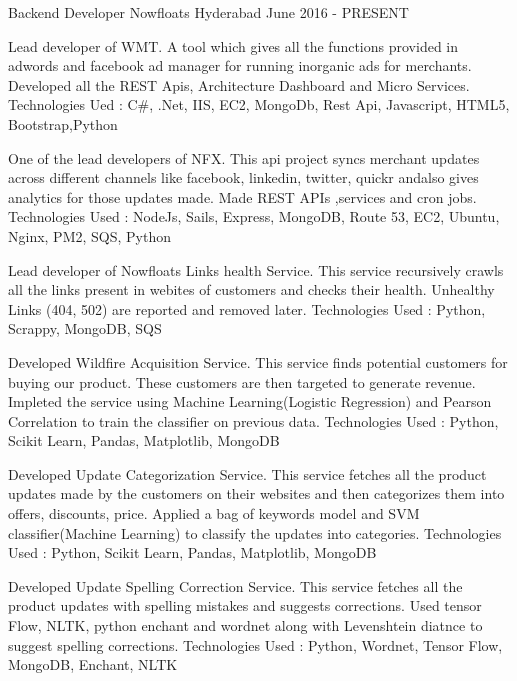 

\begin{cventries}

  \cventry
    {Backend Developer} %
    {Nowfloats} %
    {Hyderabad} %
    {June 2016 - PRESENT} %
    {
      \begin{cvitems} %
        \item {Lead developer of WMT. A tool which gives all the functions provided in adwords and facebook ad manager for running inorganic ads for merchants. Developed all the REST Apis, Architecture Dashboard and Micro Services. Technologies Ued : C\#, .Net, IIS, EC2, MongoDb, Rest Api, Javascript, HTML5, Bootstrap,Python}
        \item {One of the lead developers of NFX. This api project syncs merchant updates across different channels like facebook, linkedin, twitter, quickr andalso gives analytics for those updates made. Made REST APIs ,services and cron jobs. Technologies Used : NodeJs, Sails, Express, MongoDB, Route 53, EC2, Ubuntu, Nginx, PM2, SQS, Python}
        \item {Lead developer of Nowfloats Links health Service. This service recursively crawls all the links present in webites of customers and checks their health. Unhealthy Links (404, 502) are reported and removed later. Technologies Used : Python, Scrappy, MongoDB, SQS  }
        \item {Developed Wildfire Acquisition Service. This service finds potential customers for buying our product. These customers are then targeted to generate revenue. Impleted the service using Machine Learning(Logistic Regression) and Pearson Correlation to train the classifier on previous data. Technologies Used : Python, Scikit Learn, Pandas, Matplotlib, MongoDB  }
        \item {Developed Update Categorization Service. This service fetches all the product updates made by the customers on their websites and then categorizes them into offers, discounts, price. Applied a bag of keywords model and SVM classifier(Machine Learning) to classify the updates into categories. Technologies Used : Python, Scikit Learn, Pandas, Matplotlib, MongoDB  }
        \item {Developed Update Spelling Correction Service. This service fetches all the product updates with spelling mistakes and suggests corrections. Used tensor Flow, NLTK, python enchant and wordnet along with Levenshtein diatnce to suggest spelling corrections. Technologies Used : Python, Wordnet, Tensor Flow, MongoDB, Enchant, NLTK  }
      \end{cvitems}
    }


\end{cventries}
